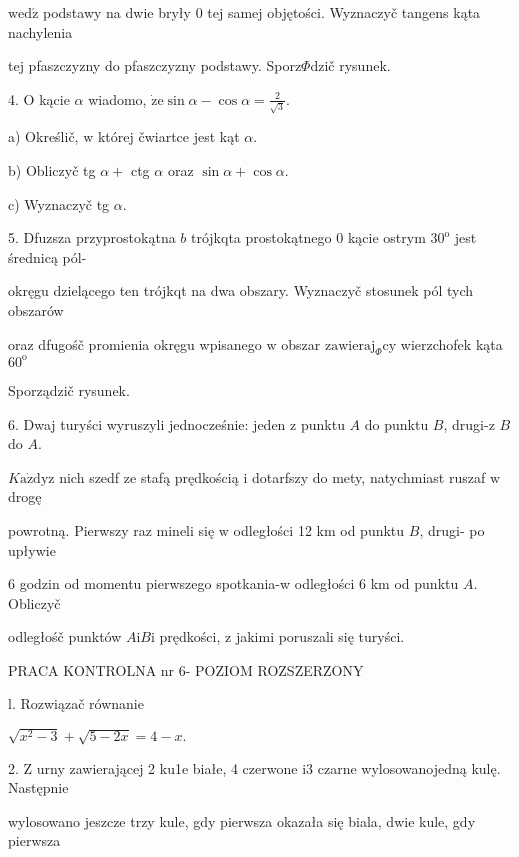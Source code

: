 \documentclass[a4paper,12pt]{article}
\begin{document}
$\mathrm{w}\mathrm{e}\mathrm{d}\acute{\mathrm{z}}$ podstawy na dwie bryły $0$ tej samej objętości. Wyznaczyč tangens kąta nachylenia

tej pfaszczyzny do pfaszczyzny podstawy. Sporz$\Phi$dzič rysunek.

4. $\mathrm{O}$ kącie $\alpha$ wiadomo, $\displaystyle \dot{\mathrm{z}}\mathrm{e}\sin\alpha-\cos\alpha=\frac{2}{\sqrt{3}}.$

a) Określič, $\mathrm{w}$ której čwiartce jest kąt $\alpha.$

b) Obliczyč tg $\alpha+$ ctg $\alpha$ oraz $\sin\alpha+\cos\alpha.$

c) Wyznaczyč tg $\alpha.$

5. Dfuzsza przyprostokątna $b$ trójkqta prostokątnego $0$ kącie ostrym $30^{\mathrm{o}}$ jest średnicą pól-

okręgu dzielącego ten trójkqt na dwa obszary. Wyznaczyč stosunek pól tych obszarów

oraz dfugośč promienia okręgu wpisanego $\mathrm{w}$ obszar $\mathrm{z}\mathrm{a}\mathrm{w}\mathrm{i}\mathrm{e}\mathrm{r}\mathrm{a}\mathrm{j}_{\Phi}\mathrm{c}\mathrm{y}$ wierzchofek kąta $60^{\mathrm{o}}$

Sporządzič rysunek.

6. Dwaj turyści wyruszyli jednocześnie: jeden $\mathrm{z}$ punktu $A$ do punktu $B$, drugi-z $B$ do $A.$

$K\mathrm{a}\dot{\mathrm{z}}\mathrm{d}\mathrm{y}\mathrm{z}$ nich szedf ze stafą prędkością $\mathrm{i}$ dotarfszy do mety, natychmiast ruszaf $\mathrm{w}$ drogę

powrotną. Pierwszy raz mineli się $\mathrm{w}$ odległości 12 km od punktu $B$, drugi- po upływie

6 godzin od momentu pierwszego spotkania-w odległości 6 km od punktu $A$. Obliczyč

odległośč punktów $A\mathrm{i}B\mathrm{i}$ prędkości, $\mathrm{z}$ jakimi poruszali się turyści.





PRACA KONTROLNA nr 6- POZIOM ROZSZERZONY

l. Rozwiązač równanie

$\sqrt{x^{2}-3}+\sqrt{5-2x}=4-x.$

2. $\mathrm{Z}$ urny zawierającej 2 ku1e białe, 4 czerwone $\mathrm{i}3$ czarne wylosowanojedną kulę. Następnie

wylosowano jeszcze trzy kule, gdy pierwsza okazała się biala, dwie kule, gdy pierwsza
\end{document}
